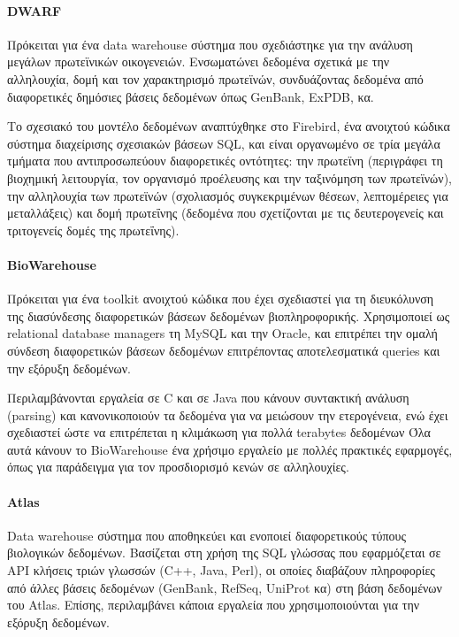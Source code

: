             \paragraph{DWARF}
                Πρόκειται για ένα data warehouse σύστημα που σχεδιάστηκε για την ανάλυση μεγάλων πρωτεϊνικών οικογενειών.
                Ενσωματώνει δεδομένα σχετικά με την αλληλουχία, δομή και τον χαρακτηρισμό πρωτεϊνών, συνδυάζοντας δεδομένα από διαφορετικές δημόσιες βάσεις δεδομένων όπως GenBank, ExPDB, κα.

                Το σχεσιακό του μοντέλο δεδομένων αναπτύχθηκε στο Firebird, ένα ανοιχτού κώδικα σύστημα διαχείρισης σχεσιακών βάσεων SQL, και είναι οργανωμένο σε τρία μεγάλα τμήματα που αντιπροσωπεύουν διαφορετικές οντότητες:
                    την πρωτεϊνη (περιγράφει τη βιοχημική λειτουργία, τον οργανισμό προέλευσης και την ταξινόμηση των πρωτεϊνών), την αλληλουχία των πρωτεϊνών (σχολιασμός συγκεκριμένων θέσεων, λεπτομέρειες για μεταλλάξεις) και δομή πρωτεΐνης (δεδομένα που σχετίζονται με τις δευτερογενείς και τριτογενείς δομές της πρωτεΐνης). \cite{DWARF}

            \paragraph{BioWarehouse}
                Πρόκειται για ένα toolkit ανοιχτού κώδικα που έχει σχεδιαστεί για τη διευκόλυνση της διασύνδεσης διαφορετικών βάσεων δεδομένων βιοπληροφορικής.
                Χρησιμοποιεί ως relational database managers τη MySQL και την Oracle, και επιτρέπει την ομαλή σύνδεση διαφορετικών βάσεων δεδομένων επιτρέποντας αποτελεσματικά queries και την εξόρυξη δεδομένων. \cite{BioWarehouse}

                Περιλαμβάνονται εργαλεία σε C και σε Java που κάνουν συντακτική ανάλυση (parsing) και κανονικοποιούν τα δεδομένα για να μειώσουν την ετερογένεια, ενώ έχει σχεδιαστεί ώστε να επιτρέπεται η κλιμάκωση για πολλά terabytes δεδομένων
                Όλα αυτά κάνουν το BioWarehouse ένα χρήσιμο εργαλείο με πολλές πρακτικές εφαρμογές, όπως για παράδειγμα για τον προσδιορισμό κενών σε αλληλουχίες.

            \paragraph{Atlas}
                Data warehouse σύστημα που αποθηκεύει και ενοποιεί διαφορετικούς τύπους βιολογικών δεδομένων.
                Βασίζεται στη χρήση της SQL γλώσσας που εφαρμόζεται σε API κλήσεις τριών γλωσσών (C++, Java, Perl), οι οποίες διαβάζουν πληροφορίες από άλλες βάσεις δεδομένων (GenBank, RefSeq, UniProt κα) στη βάση δεδομένων του Atlas.
                Επίσης, περιλαμβάνει κάποια εργαλεία που χρησιμοποιούνται για την εξόρυξη δεδομένων. \cite{Atlas}

